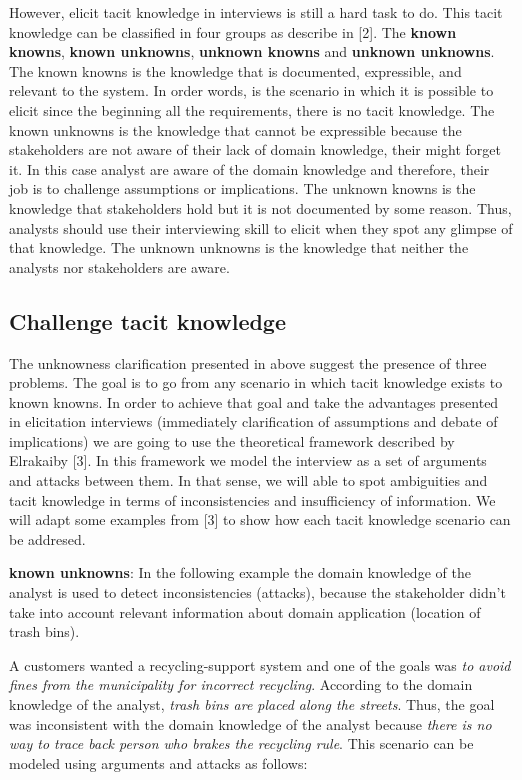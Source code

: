 \documentclass[]{llncs}
\begin{document}
However, elicit tacit knowledge in interviews is still a hard task to
do. This tacit knowledge can be classified in four groups as describe in
{[}2{]}. The \textbf{known knowns}, \textbf{known unknowns},
\textbf{unknown knowns} and \textbf{unknown unknowns}. The known knowns
is the knowledge that is documented, expressible, and relevant to the
system. In order words, is the scenario in which it is possible to
elicit since the beginning all the requirements, there is no tacit
knowledge. The known unknowns is the knowledge that cannot be
expressible because the stakeholders are not aware of their lack of
domain knowledge, their might forget it. In this case analyst are aware
of the domain knowledge and therefore, their job is to challenge
assumptions or implications. The unknown knowns is the knowledge that
stakeholders hold but it is not documented by some reason. Thus,
analysts should use their interviewing skill to elicit when they spot
any glimpse of that knowledge. The unknown unknowns is the knowledge
that neither the analysts nor stakeholders are aware.

\hypertarget{challenge-tacit-knowledge}{%
\subsection{Challenge tacit knowledge}\label{challenge-tacit-knowledge}}

The unknowness clarification presented in above suggest the presence of
three problems. The goal is to go from any scenario in which tacit
knowledge exists to known knowns. In order to achieve that goal and take
the advantages presented in elicitation interviews (immediately
clarification of assumptions and debate of implications) we are going to
use the theoretical framework described by Elrakaiby {[}3{]}. In this
framework we model the interview as a set of arguments and attacks
between them. In that sense, we will able to spot ambiguities and tacit
knowledge in terms of inconsistencies and insufficiency of information.
We will adapt some examples from {[}3{]} to show how each tacit
knowledge scenario can be addresed.

\textbf{known unknowns}: In the following example the domain knowledge
of the analyst is used to detect inconsistencies (attacks), because the
stakeholder didn't take into account relevant information about domain
application (location of trash bins).

A customers wanted a recycling-support system and one of the goals was
\emph{to avoid fines from the municipality for incorrect recycling}.
According to the domain knowledge of the analyst, \emph{trash bins are
placed along the streets}. Thus, the goal was inconsistent with the
domain knowledge of the analyst because \emph{there is no way to trace
back person who brakes the recycling rule}. This scenario can be modeled
using arguments and attacks as follows:
\end{document}
